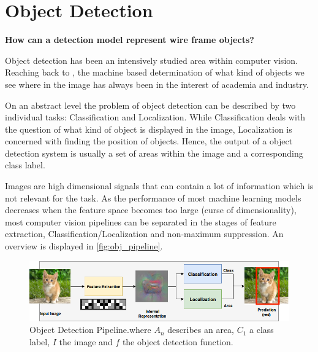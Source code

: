 	\chapter{Object Detection}
	
	\label{sec:object_detection}
	
	\begin{center}
		\textbf{ How can a detection model represent wire frame objects?}
	\end{center}
	
	
	Object detection has been an intensively studied area within computer vision. Reaching back to , the machine based determination of what kind of objects we see where in the image has always been in the interest of academia and industry.
	
	On an abstract level the problem of object detection can be described by two individual tasks: Classification and Localization. While Classification deals with the question of what kind of object is displayed in the image, Localization is concerned with finding the position of objects. Hence, the output of a object detection system is usually a set of areas within the image and a corresponding class label. 
	
	Images are high dimensional signals that can contain a lot of information which is not relevant for the task. As the performance of most machine learning models decreases when the feature space becomes too large (curse of dimensionality), most computer vision pipelines can be separated in the stages of feature extraction, Classification/Localization and non-maximum suppression. An overview is displayed in \autoref{fig:obj_pipeline}.
	
	\begin{figure}[hbtp]
	
	\centering
	\includegraphics[width=\linewidth]{fig/ObjectDetection}
	\caption{Object Detection Pipeline.where $A_n$ describes an area, $C_1$ a class label, $I$ the image and $f$ the object detection function.}
	\label{fig:obj_pipeline}
	
	\end{figure}

